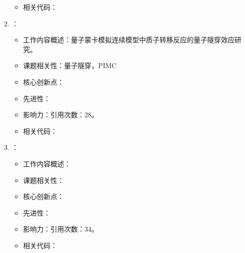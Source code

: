 \begin{enumerate}
\begin{itemize}
        \item 相关代码：
    \end{itemize}
    \item \citet{mazzola2017quantum}：
    \begin{itemize}
        \item 工作内容概述：量子蒙卡模拟连续模型中质子转移反应的量子隧穿效应研究。
        \item 课题相关性：量子隧穿，PIMC
        \item 核心创新点：
        \item 先进性：
        \item 影响力：引用次数：28。
        \item 相关代码：
    \end{itemize}
    \item \citet{bravyi2017polynomial}：
    \begin{itemize}
        \item 工作内容概述：
        \item 课题相关性：
        \item 核心创新点：
        \item 先进性：
        \item 影响力：引用次数：34。
        \item 相关代码：
    \end{itemize}
\end{enumerate}